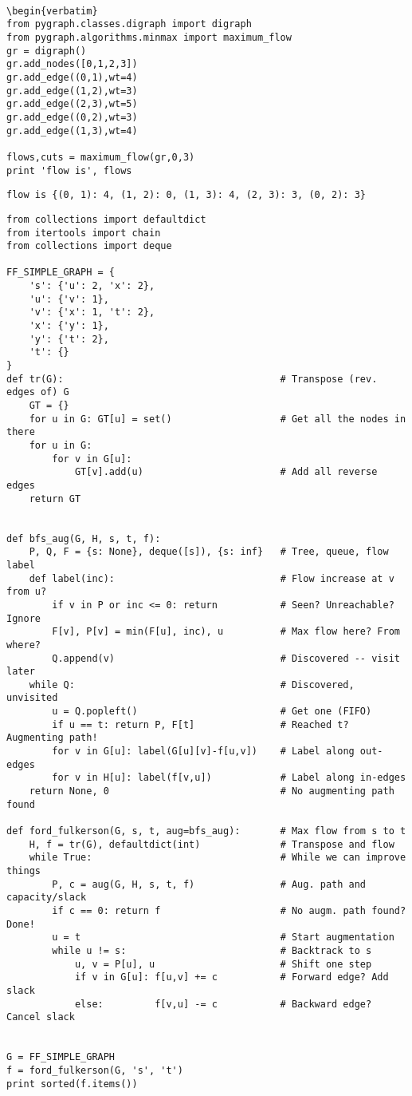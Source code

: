 \begin{verbatim}

\begin{verbatim}
from pygraph.classes.digraph import digraph
from pygraph.algorithms.minmax import maximum_flow
gr = digraph()
gr.add_nodes([0,1,2,3])
gr.add_edge((0,1),wt=4)
gr.add_edge((1,2),wt=3)
gr.add_edge((2,3),wt=5)
gr.add_edge((0,2),wt=3)
gr.add_edge((1,3),wt=4)

flows,cuts = maximum_flow(gr,0,3)
print 'flow is', flows
\end{verbatim}

\begin{verbatim}
flow is {(0, 1): 4, (1, 2): 0, (1, 3): 4, (2, 3): 3, (0, 2): 3}
\end{verbatim}

\begin{verbatim}
from collections import defaultdict
from itertools import chain
from collections import deque

FF_SIMPLE_GRAPH = {
    's': {'u': 2, 'x': 2},
    'u': {'v': 1},
    'v': {'x': 1, 't': 2},
    'x': {'y': 1},
    'y': {'t': 2},
    't': {}
}
def tr(G):                                      # Transpose (rev. edges of) G
    GT = {}
    for u in G: GT[u] = set()                   # Get all the nodes in there
    for u in G:
        for v in G[u]:
            GT[v].add(u)                        # Add all reverse edges
    return GT


def bfs_aug(G, H, s, t, f):
    P, Q, F = {s: None}, deque([s]), {s: inf}   # Tree, queue, flow label
    def label(inc):                             # Flow increase at v from u?
        if v in P or inc <= 0: return           # Seen? Unreachable? Ignore
        F[v], P[v] = min(F[u], inc), u          # Max flow here? From where?
        Q.append(v)                             # Discovered -- visit later
    while Q:                                    # Discovered, unvisited
        u = Q.popleft()                         # Get one (FIFO)
        if u == t: return P, F[t]               # Reached t? Augmenting path!
        for v in G[u]: label(G[u][v]-f[u,v])    # Label along out-edges
        for v in H[u]: label(f[v,u])            # Label along in-edges
    return None, 0                              # No augmenting path found

def ford_fulkerson(G, s, t, aug=bfs_aug):       # Max flow from s to t
    H, f = tr(G), defaultdict(int)              # Transpose and flow
    while True:                                 # While we can improve things
        P, c = aug(G, H, s, t, f)               # Aug. path and capacity/slack
        if c == 0: return f                     # No augm. path found? Done!
        u = t                                   # Start augmentation
        while u != s:                           # Backtrack to s
            u, v = P[u], u                      # Shift one step
            if v in G[u]: f[u,v] += c           # Forward edge? Add slack
            else:         f[v,u] -= c           # Backward edge? Cancel slack


G = FF_SIMPLE_GRAPH
f = ford_fulkerson(G, 's', 't')
print sorted(f.items())
\end{verbatim}

